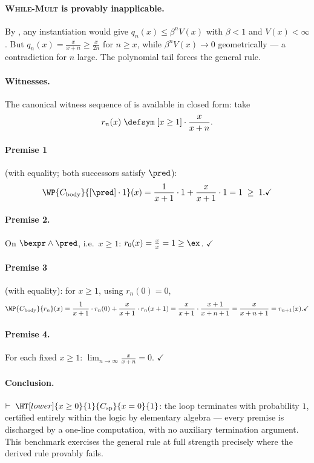 \paragraph{\textsc{While-Mult} is provably inapplicable.}
By , any instantiation would give
$q_n(x) \leq \beta^n V(x)$ with $\beta \lt 1$ and $V(x) \lt \infty$. But
$q_n(x) = \tfrac{x}{x+n} \geq \tfrac{x}{2n}$ for $n \geq x$, while
$\beta^n V(x) \to 0$ geometrically --- a contradiction for $n$ large. The
polynomial tail forces the general rule.

\paragraph{Witnesses.}
The canonical witness sequence of  is available
in closed form: take
\[
  r_n(x) \;\defsym\; [x \geq 1]\cdot\frac{x}{x+n}.
\]

\paragraph{Premise 1} (with equality; both successors satisfy $\pred$):
\[
  \WP{C_{\text{body}}}{[\pred]\cdot 1}(x)
  = \frac{1}{x+1}\cdot 1 + \frac{x}{x+1}\cdot 1
  = 1
  \;\geq\; 1.
  \checkmark
\]

\paragraph{Premise 2.}
On $\bexpr\land\pred$, i.e.\ $x \geq 1$:
$r_0(x) = \tfrac{x}{x} = 1 \geq \ex$. $\checkmark$

\paragraph{Premise 3} (with equality): for $x \geq 1$, using $r_n(0) = 0$,
\[
  \WP{C_{\text{body}}}{r_n}(x)
  = \frac{1}{x+1}\cdot r_n(0) + \frac{x}{x+1}\cdot r_n(x+1)
  = \frac{x}{x+1}\cdot\frac{x+1}{x+n+1}
  = \frac{x}{x+n+1}
  = r_{n+1}(x).
  \checkmark
\]

\paragraph{Premise 4.}
For each fixed $x \geq 1$:
$\lim_{n\to\infty} \tfrac{x}{x+n} = 0$. $\checkmark$

\paragraph{Conclusion.}
$\vdash\; \HT[lower]{x \geq 0}{1}{C_{\text{sp}}}{x = 0}{1}$: the loop
terminates with probability $1$, certified entirely within the logic by
elementary algebra --- every premise is discharged by a one-line computation,
with no auxiliary termination argument. This benchmark exercises the general
rule at full strength precisely where the derived rule provably fails.


